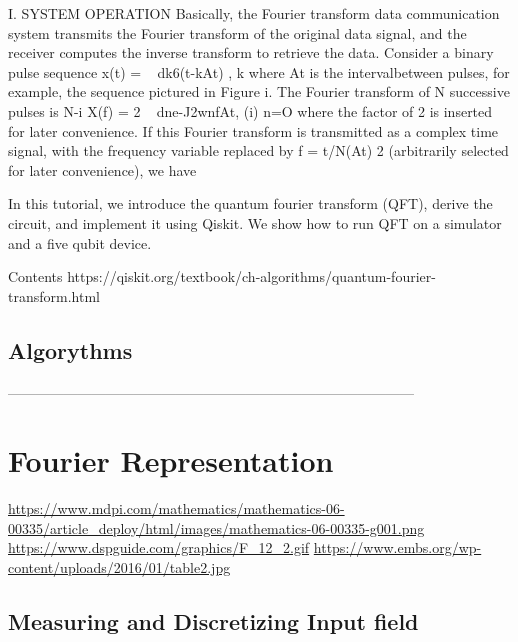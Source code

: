\documentclass[ams,fleqn,amsmath,amssymb]{article}
\begin{document}
\begin{}
  I. SYSTEM OPERATION
  Basically, the Fourier transform data communication
  system transmits the Fourier transform of the original data
  signal, and the receiver computes the inverse transform to
  retrieve the data. Consider a binary pulse sequence
  x(t) = ~ dk6(t-kAt) ,
  k
  where At is the intervalbetween pulses, for example, the sequence
  pictured in Figure i. The Fourier transform of N successive pulses
  is
  N-i
  X(f) = 2 ~ dne-J2wnfAt, (i)
  n=O
  where the factor of 2 is inserted for later convenience. If this
  Fourier transform is transmitted as a complex time signal, with
  the frequency variable replaced by f = t/N(At) 2 (arbitrarily
  selected for later convenience), we have 
  
  In this tutorial, we introduce the quantum fourier transform (QFT), derive the circuit, and implement it using Qiskit. We show how to run QFT on a simulator and a five qubit device.
  
  Contents 
  https://qiskit.org/textbook/ch-algorithms/quantum-fourier-transform.html
  
\end{}



\begin{}
  
  \section*{Algorythms}
  
\end{}





---------------------------------------------------------------------------------------

\section{Fourier Representation}
\url{https://www.mdpi.com/mathematics/mathematics-06-00335/article_deploy/html/images/mathematics-06-00335-g001.png}
\url{https://www.dspguide.com/graphics/F_12_2.gif}
\url{https://www.embs.org/wp-content/uploads/2016/01/table2.jpg}

\subsection{Measuring and Discretizing Input field}
\end{document}
